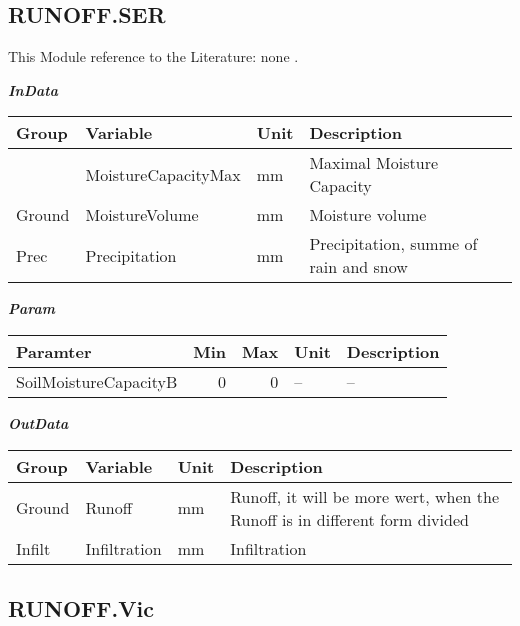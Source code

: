 \documentclass[
]{book}
\begin{document}
\hypertarget{runoff.ser}{%
\subsection{RUNOFF.SER}\label{runoff.ser}}

This Module reference to the Literature: none \citep{none}.

\textbf{\emph{InData}}

\begin{table}[!h]
\centering
\begin{tabular}{l|l|l|l}
\hline
Group & Variable & Unit & Description\\
\hline
 & MoistureCapacityMax & mm & Maximal Moisture Capacity\\
\cline{2-4}
\multirow{-2}{*}{\raggedright\arraybackslash Ground} & MoistureVolume & mm & Moisture volume\\
\cline{1-4}
Prec & Precipitation & mm & Precipitation, summe of rain and snow\\
\hline
\end{tabular}
\end{table}

\textbf{\emph{Param}}

\begin{table}[!h]
\centering
\begin{tabular}{l|r|r|l|l}
\hline
Paramter & Min & Max & Unit & Description\\
\hline
SoilMoistureCapacityB & 0 & 0 & -- & --\\
\hline
\end{tabular}
\end{table}

\textbf{\emph{OutData}}

\begin{table}[!h]
\centering
\begin{tabular}{l|l|l|l}
\hline
Group & Variable & Unit & Description\\
\hline
Ground & Runoff & mm & Runoff, it will be more wert, when the Runoff is in different form divided\\
\cline{1-4}
Infilt & Infiltration & mm & Infiltration\\
\hline
\end{tabular}
\end{table}

\hypertarget{runoff.vic}{%
\subsection{RUNOFF.Vic}\label{runoff.vic}}
\end{document}

